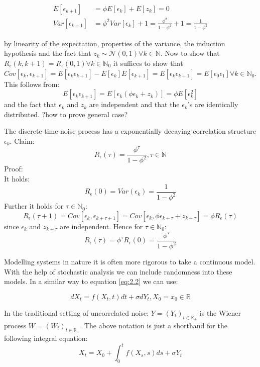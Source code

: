 \documentclass[%
thesis=student,%
coverpage=false,%
titlepage=false,%
headmarks=true, %
german,%
font=libertine, %
math=newpxtx, %
BCOR=5mm,%
coverBCOR=11mm%
]{tumbook}
\begin{document}
\begin{subequations}
    \begin{align}
        E[\epsilon_{k+1}] &= \phi E[\epsilon_{k}] + E[z_{k}]  = 0 \\
        Var[\epsilon_{k+1}] &= \phi^2 Var[\epsilon_{k}] + 1 = \frac{\phi^2}{1-\phi^2} + 1 = \frac{1}{1-\phi^2}     
    \end{align}
\end{subequations}   

by linearity of the expectation, properties of the variance, the induction hypothesis and the fact that $z_{k} \sim \mathcal{N}(0,1) \forall k \in \mathbb{N}$. Now to show that $R_{\epsilon}(k,k+1) = R_{\epsilon}(0,1) \forall k \in \mathbb{N}_{0}$ it suffices to show that $Cov[\epsilon_{k},\epsilon_{k+1}] = E[\epsilon_{k}\epsilon_{k+1}] - E[\epsilon_{k}]E[\epsilon_{k+1}] = E[\epsilon_{k}\epsilon_{k+1}] = E[\epsilon_{0}\epsilon_{1}] \forall k \in \mathbb{N}_{0}$. This follows from: 
\[
E[\epsilon_{k}\epsilon_{k+1}] = E[\epsilon_{k}(\phi\epsilon_{k} + z_{k})] = \phi E[\epsilon_{k}^2]
\]
and the fact that $\epsilon_{k}$ and $z_{k}$ are independent and that the $\epsilon_{k}$'s are identically distributed. ?how to prove general case?

The discrete time noise process has a exponentially decaying correlation structure $\epsilon_{k}$. Claim:
\[
R_{\epsilon}(\tau) = \frac{\phi^{\tau}}{1-\phi^{2}}, \tau \in \mathbb{N}
\]
Proof: \\
It holds: 
\[
R_{\epsilon}(0)= Var(\epsilon_{k}) = \frac{1}{1-\phi^{2}}
\]
Further it holds for $\tau \in \mathbb{N}_{0}$:
\[
R_{\epsilon}(\tau+1) = Cov[\epsilon_{k},\epsilon_{k+\tau + 1}] = Cov[\epsilon_{k},\phi\epsilon_{k+\tau}+z_{k+\tau}] = \phi R_{\epsilon}(\tau)
\]
since $\epsilon_{k}$ and $z_{k+\tau}$ are independent. Hence for $\tau \in \mathbb{N}_{0}$:
\[
R_{\epsilon}(\tau) = \phi^{\tau}R_{\epsilon}(0)=\frac{\phi^{\tau}}{1-\phi^{2}}
\]

Modelling systems in nature it is often more rigorous to take a continuous model. With the help of stochastic analysis we can include randomness into these models. In a similar way to equation \ref{eq:2.2} we can use: 

\begin{equation}
    dX_{t} = f(X_{t},t)dt + \sigma dY_{t}, X_{0} = x_{0} \in \mathbb{R}
\end{equation}

In the traditional setting of uncorrelated noise: $Y = (Y_{t})_{t \in \mathbb{R}_{+}}$ is the Wiener process $W = (W_{t})_{t\in \mathbb{R}_{+}}$. The above notation is just a shorthand for the following integral equation:
\[
X_{t} = X_{0} + \int_{0}^{t}f(X_{s},s)ds + \sigma Y_{t}
\]
\end{document}
